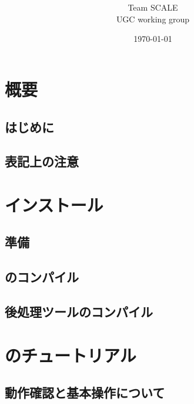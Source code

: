 \documentclass[a4paper]{jreport}
\title{{\vspace{2cm}{\Large Version \version} }}
\author{\Large Team SCALE\\ UGC working group}
\date{\today}
\begin{document}
\maketitle
\ClearWallPaper
{}
\tableofcontents


\part{概要} \label{part:overview}
 \chapter{はじめに} \label{sec:introduction}
 
 \chapter{表記上の注意} \label{sec:notation}
 

\part{インストール} \label{part:install}
 \chapter{準備}
 
 \chapter{\scalelib のコンパイル}
 
 \chapter{後処理ツールのコンパイル}
 

\part{\scalerm のチュートリアル}
\chapter{動作確認と基本操作について} \label{chap:tutorial_ideal}




\end{document}
